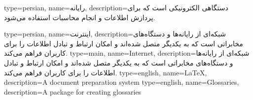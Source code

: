 \usepackage{amsthm,amssymb,amsmath}
\usepackage[top=40mm, bottom=40mm, left=25mm, right=35mm]{geometry}
\usepackage{graphicx}
\usepackage{framed} 
\usepackage{lastpage}
\usepackage{imakeidx}
\usepackage{pdfpages}
\usepackage{chemformula}
\usepackage[xindy]{imakeidx}
\usepackage[pagebackref=false]{hyperref}
\hypersetup{
  colorlinks   = true, %
  urlcolor     = black, %
  linkcolor    = black, %
  citecolor   = black %
}
\usepackage[xindy,acronym,nonumberlist=true]{glossaries}

\usepackage{fancyhdr}
\usepackage{setspace}
\usepackage{algorithm}
\usepackage{algorithmic}
\usepackage{subfigure}
\usepackage{caption}
\usepackage[subfigure]{tocloft}
\usepackage[nottoc]{tocbibind}
{}

\makeglossaries

{
    type=persian,
    name={رایانه},
    description={دستگاهی الکترونیکی است که برای پردازش اطلاعات و انجام محاسبات استفاده می‌شود.}
}

{
    type=persian,
    name={اینترنت},
    description={شبکه‌ای از رایانه‌ها و دستگاه‌های مخابراتی است که به یکدیگر متصل شده‌اند و امکان ارتباط و تبادل اطلاعات را برای کاربران فراهم می‌کند.}
}
{
    type=main,
    name={Internet},
    description={شبکه‌ای از رایانه‌ها و دستگاه‌های مخابراتی است که به یکدیگر متصل شده‌اند و امکان ارتباط و تبادل اطلاعات را برای کاربران فراهم می‌کند.}
}
{
    type=english,
    name={LaTeX},
    description={A document preparation system}
}
{
    type=english,
    name={Glossaries},
    description={A package for creating glossaries}
}



